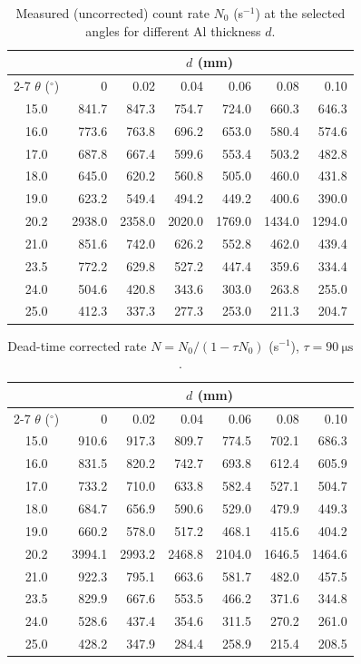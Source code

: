 \documentclass[11pt,a4paper]{article}
\begin{document}
\begin{table}[H]
\centering
\caption{Measured (uncorrected) count rate $N_0$ (s$^{-1}$) at the selected angles for different Al thickness $d$.}
\label{tab:raw}
\small
\begin{tabular}{c rrrrrr}
\toprule
 & \multicolumn{6}{c}{$d$ (mm)}\\
\cmidrule(l){2-7}
$\theta$ ($^\circ$) & 0 & 0.02 & 0.04 & 0.06 & 0.08 & 0.10 \\
\midrule
15.0 & 841.7 & 847.3 & 754.7 & 724.0 & 660.3 & 646.3 \\
16.0 & 773.6 & 763.8 & 696.2 & 653.0 & 580.4 & 574.6 \\
17.0 & 687.8 & 667.4 & 599.6 & 553.4 & 503.2 & 482.8 \\
18.0 & 645.0 & 620.2 & 560.8 & 505.0 & 460.0 & 431.8 \\
19.0 & 623.2 & 549.4 & 494.2 & 449.2 & 400.6 & 390.0 \\
20.2 & 2938.0 & 2358.0 & 2020.0 & 1769.0 & 1434.0 & 1294.0 \\
21.0 & 851.6 & 742.0 & 626.2 & 552.8 & 462.0 & 439.4 \\
23.5 & 772.2 & 629.8 & 527.2 & 447.4 & 359.6 & 334.4 \\
24.0 & 504.6 & 420.8 & 343.6 & 303.0 & 263.8 & 255.0 \\
25.0 & 412.3 & 337.3 & 277.3 & 253.0 & 211.3 & 204.7 \\
\bottomrule
\end{tabular}
\end{table}

\begin{table}[H]
\centering
\caption{Dead-time corrected rate $N=N_0/(1-\tau N_0)$ (s$^{-1}$), $\tau=\SI{90}{\micro\second}$.}
\label{tab:cor}
\small
\begin{tabular}{c rrrrrr}
\toprule
 & \multicolumn{6}{c}{$d$ (mm)}\\
\cmidrule(l){2-7}
$\theta$ ($^\circ$) & 0 & 0.02 & 0.04 & 0.06 & 0.08 & 0.10 \\
\midrule
15.0 & 910.6 & 917.3 & 809.7 & 774.5 & 702.1 & 686.3 \\
16.0 & 831.5 & 820.2 & 742.7 & 693.8 & 612.4 & 605.9 \\
17.0 & 733.2 & 710.0 & 633.8 & 582.4 & 527.1 & 504.7 \\
18.0 & 684.7 & 656.9 & 590.6 & 529.0 & 479.9 & 449.3 \\
19.0 & 660.2 & 578.0 & 517.2 & 468.1 & 415.6 & 404.2 \\
20.2 & 3994.1 & 2993.2 & 2468.8 & 2104.0 & 1646.5 & 1464.6 \\
21.0 & 922.3 & 795.1 & 663.6 & 581.7 & 482.0 & 457.5 \\
23.5 & 829.9 & 667.6 & 553.5 & 466.2 & 371.6 & 344.8 \\
24.0 & 528.6 & 437.4 & 354.6 & 311.5 & 270.2 & 261.0 \\
25.0 & 428.2 & 347.9 & 284.4 & 258.9 & 215.4 & 208.5 \\
\bottomrule
\end{tabular}
\end{table}
\end{document}
